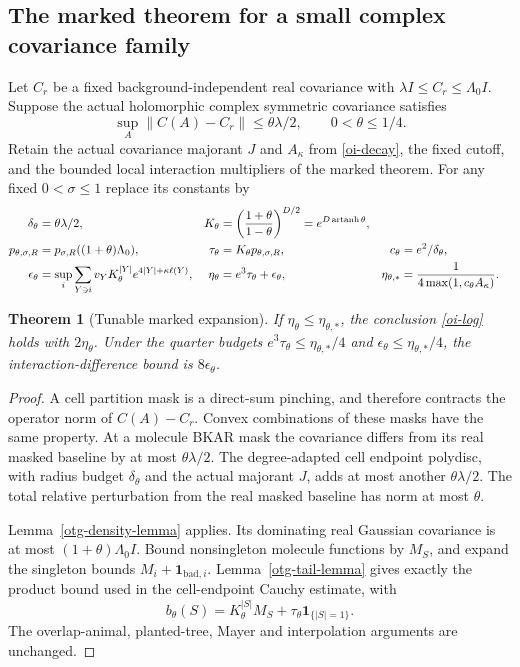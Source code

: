 \documentclass[11pt]{article}
\newtheorem{theorem}{Theorem}[section]
\begin{document}
\subsection{The marked theorem for a small complex covariance family}

Let $C_r$ be a fixed background-independent real covariance with
$\lambda I\le C_r\le\Lambda_0 I$. Suppose the actual holomorphic
complex symmetric covariance satisfies
\begin{equation}\label{otg-close}
 \sup_A\|C(A)-C_r\|\le\theta\lambda/2,\qquad
                                  0<\theta\le1/4.
\end{equation}
Retain the actual covariance majorant $J$ and $A_\kappa$
from \eqref{oi-decay}, the fixed cutoff, and the bounded local
interaction multipliers of the marked theorem.
For any fixed $0<\sigma\le1$ replace its constants by
\begin{align}
 \delta_\theta&=\theta\lambda/2,&
 K_\theta&=\left(\frac{1+\theta}{1-\theta}\right)^{D/2}
                     =e^{D\operatorname{artanh}\theta},\notag\\
 p_{\theta,\sigma,R}
       &=p_{\sigma,R}((1+\theta)\Lambda_0),&
 \tau_\theta&=K_\theta p_{\theta,\sigma,R},&
 c_\theta&=e^2/\delta_\theta,\notag\\
 \epsilon_\theta&=\sup_i\sum_{Y\ni i}
       v_YK_\theta^{|Y|}e^{4|Y|+\kappa\ell(Y)},&
 \eta_\theta&=e^3\tau_\theta+\epsilon_\theta,&
 \eta_{\theta,*}&=\frac1{4\max(1,c_\theta A_\kappa)}.
                                                        \label{otg-mark-constants}
\end{align}

\begin{theorem}[Tunable marked expansion]\label{otg-mark-theorem}
If $\eta_\theta\le\eta_{\theta,*}$, the conclusion
\eqref{oi-log} holds with $2\eta_\theta$.
Under the quarter budgets
$e^3\tau_\theta\le\eta_{\theta,*}/4$ and
$\epsilon_\theta\le\eta_{\theta,*}/4$,
the interaction-difference bound is $8\epsilon_\theta$.
\end{theorem}
\begin{proof}
A cell partition mask is a direct-sum pinching, and therefore
contracts the operator norm of $C(A)-C_r$. Convex combinations
of these masks have the same property. At a molecule BKAR
mask the covariance differs from its real masked baseline by
at most $\theta\lambda/2$. The degree-adapted cell endpoint
polydisc, with radius budget $\delta_\theta$ and the actual
majorant $J$, adds at most another $\theta\lambda/2$.
The total relative perturbation from the real masked baseline
has norm at most $\theta$.

Lemma~\ref{otg-density-lemma} applies. Its dominating real
Gaussian covariance is at most $(1+\theta)\Lambda_0I$.
Bound nonsingleton molecule functions by $M_S$, and expand
the singleton bounds $M_i+\mathbf1_{\mathrm{bad},i}$.
Lemma~\ref{otg-tail-lemma} gives exactly the product bound
used in the cell-endpoint Cauchy estimate, with
\[
 b_\theta(S)=K_\theta^{|S|}M_S+
                      \tau_\theta\mathbf1_{\{|S|=1\}}.
\]
The overlap-animal, planted-tree, Mayer and interpolation
arguments are unchanged.
\end{proof}
\end{document}
